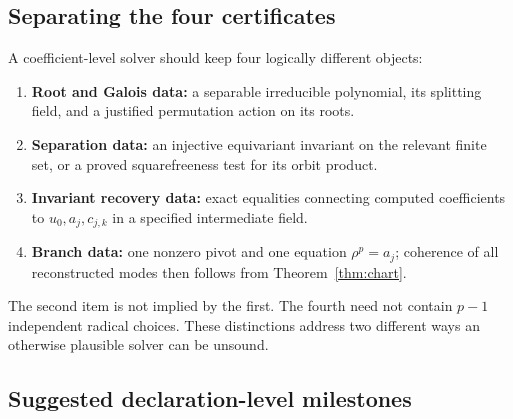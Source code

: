 \documentclass[11pt,a4paper]{article}
\theoremstyle{definition}
\theoremstyle{remark}
\begin{document}
\subsection{Separating the four certificates}

A coefficient-level solver should keep four logically different objects:
\begin{enumerate}[label=(\arabic*)]
\item \textbf{Root and Galois data:} a separable irreducible polynomial, its
splitting field, and a justified permutation action on its roots.
\item \textbf{Separation data:} an injective equivariant invariant on the
relevant finite set, or a proved squarefreeness test for its orbit product.
\item \textbf{Invariant recovery data:} exact equalities connecting computed
coefficients to $u_0,a_j,c_{j,k}$ in a specified intermediate field.
\item \textbf{Branch data:} one nonzero pivot and one equation
$\rho^p=a_j$; coherence of all reconstructed modes then follows from
Theorem~\ref{thm:chart}.
\end{enumerate}
The second item is not implied by the first. The fourth need not contain
$p-1$ independent radical choices. These distinctions address two different
ways an otherwise plausible solver can be unsound.

\subsection{Suggested declaration-level milestones}
\end{document}
